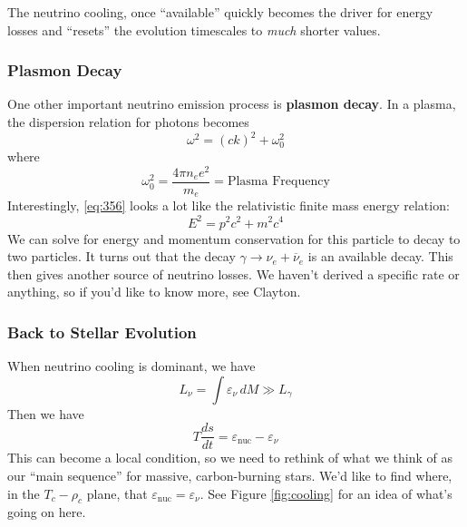 \documentclass[10pt]{article}
\numberwithin{equation}{section}
\newcommand{\figref}[1]{Figure \ref{#1}}
\begin{document}
    The neutrino cooling, once ``available'' quickly becomes the
    driver for energy losses and ``resets'' the evolution timescales
    to \emph{much} shorter values.

    \subsubsection{Plasmon Decay}
    \label{sec:plasmon-decay}

   One other important neutrino emission process is \textbf{plasmon
      decay}. In a plasma, the dispersion relation for photons becomes
    \begin{equation}
      \label{eq:356}
      \omega^2=(ck)^2+\omega_0^2
    \end{equation}
    where 
    \begin{equation}
      \label{eq:357}
      \omega_0^2=\frac{4\pi n_e e^2}{m_e}=\textrm{Plasma Frequency}
    \end{equation}
    Interestingly, \eqref{eq:356} looks a lot like the relativistic
    finite mass energy relation:
    \begin{equation}
      \label{eq:358}
      E^2=p^2c^2+m^2 c^4
    \end{equation}
    We can solve for energy and momentum conservation for this particle
    to decay to two particles. It turns out that the decay $\gamma\to
    \nu_e + \overline{\nu}_e$ is an available decay. This then gives
    another source of neutrino losses. We haven't derived a specific
    rate or anything, so if you'd like to know more, see Clayton.

    \subsubsection{Back to Stellar Evolution}
    \label{sec:back-stell-evol}

    When neutrino cooling is dominant, we have
    \begin{equation}
      \label{eq:359}
      L_\nu=\int \varepsilon_\nu\,dM\gg L_\gamma
    \end{equation}
    Then we have
    \begin{equation}
      \label{eq:360}
      T\frac{ds}{dt}=\varepsilon_{\mathrm{nuc}}-\varepsilon_\nu
    \end{equation}
    This can become a local condition, so we need to rethink of what
    we think of as our ``main sequence'' for massive, carbon-burning
    stars. We'd like to find where, in the $T_c-\rho_c$ plane, that
    $\varepsilon_{\mathrm{nuc}}=\varepsilon_\nu$. See
    \figref{fig:cooling} for an idea of what's going on here.\\
\end{document}
